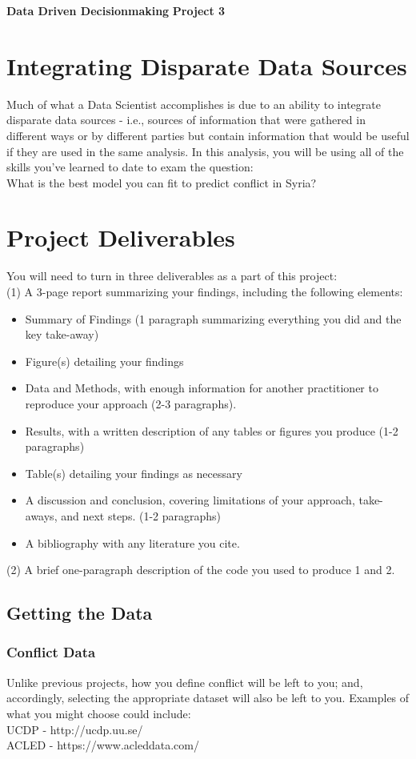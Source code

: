 \documentclass[a4paper, 11pt]{article}
\begin{document}
\noindent
\large\textbf{Data Driven Decisionmaking} \hfill \textbf{Project 3} \\

\section*{Integrating Disparate Data Sources}
Much of what a Data Scientist accomplishes is due to an ability to integrate disparate data sources - i.e., sources of information that were gathered in different ways or by different parties but contain information that would be useful if they are used in the same analysis.  In this analysis, you will be using all of the skills you've learned to date to exam the question:\\
What is the best model you can fit to predict conflict in Syria?

\section{Project Deliverables}
You will need to turn in three deliverables as a part of this project:\\
(1) A 3-page report summarizing your findings, including the following elements:
\begin{itemize}
\item Summary of Findings (1 paragraph summarizing everything you did and the key take-away)
\item Figure(s) detailing your findings
\item Data and Methods, with enough information for another practitioner to reproduce your approach (2-3 paragraphs).  
\item Results, with a written description of any tables or figures you produce (1-2 paragraphs)
\item Table(s) detailing your findings as necessary
\item A discussion and conclusion, covering limitations of your approach, take-aways, and next steps. (1-2 paragraphs)
\item A bibliography with any literature you cite.
\end{itemize}
(2) A brief one-paragraph description of the code you used to produce 1 and 2.\\

\subsection{Getting the Data}
\subsubsection{Conflict Data}
Unlike previous projects, how you define conflict will be left to you; and, accordingly, selecting the appropriate dataset will also be left to you.  Examples of what you might choose could include:\\
UCDP - http://ucdp.uu.se/ \\
ACLED - https://www.acleddata.com/ \\
\end{document}
